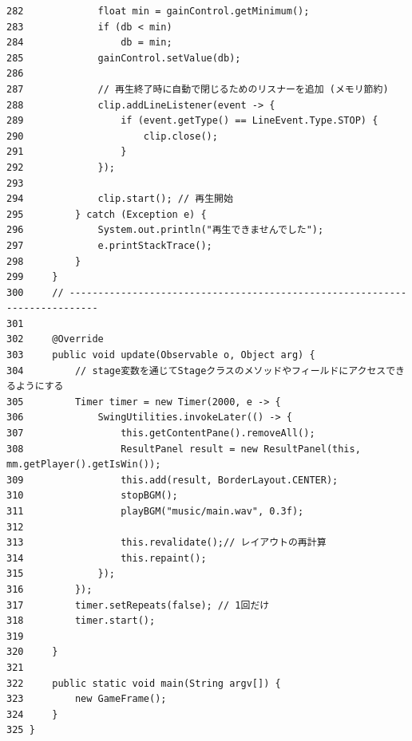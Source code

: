 \documentclass[11pt,a4j]{jarticle}
\begin{document}
\begin{small}
\begin{verbatim}
282             float min = gainControl.getMinimum();
283             if (db < min)
284                 db = min;
285             gainControl.setValue(db);
286 
287             // 再生終了時に自動で閉じるためのリスナーを追加 (メモリ節約)
288             clip.addLineListener(event -> {
289                 if (event.getType() == LineEvent.Type.STOP) {
290                     clip.close();
291                 }
292             });
293 
294             clip.start(); // 再生開始
295         } catch (Exception e) {
296             System.out.println("再生できませんでした");
297             e.printStackTrace();
298         }
299     }
300     // ---------------------------------------------------------------------------
301 
302     @Override
303     public void update(Observable o, Object arg) {
304         // stage変数を通じてStageクラスのメソッドやフィールドにアクセスできるようにする
305         Timer timer = new Timer(2000, e -> {
306             SwingUtilities.invokeLater(() -> {
307                 this.getContentPane().removeAll();
308                 ResultPanel result = new ResultPanel(this, mm.getPlayer().getIsWin());
309                 this.add(result, BorderLayout.CENTER);
310                 stopBGM();
311                 playBGM("music/main.wav", 0.3f);
312 
313                 this.revalidate();// レイアウトの再計算
314                 this.repaint();
315             });
316         });
317         timer.setRepeats(false); // 1回だけ
318         timer.start();
319 
320     }
321 
322     public static void main(String argv[]) {
323         new GameFrame();
324     }
325 }
\end{verbatim}
\end{small}
\end{document}
